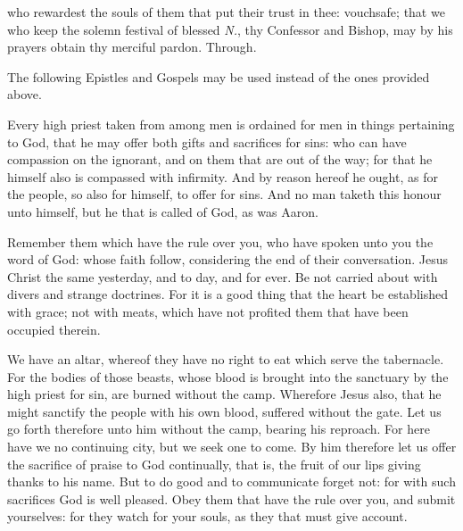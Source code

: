 \postcommunion\label{CommonConfessorBishopIIPostcommunion}

\vspace{-0.1\baselineskip}

 who rewardest the souls of them that put their trust in thee: vouchsafe; that we who keep the solemn festival of blessed \textit{N.}, thy Confessor and Bishop, may by his prayers obtain thy merciful pardon. Through.

\clearpage
\begin{rubric}
	The following Epistles and Gospels may be used instead of the ones provided above.
\end{rubric}

\label{Hebrews51}
 Every high priest taken from among men is ordained for men in things pertaining to God, that he may offer both gifts and sacrifices for sins: who can have compassion on the ignorant, and on them that are out of the way; for that he himself also is compassed with infirmity. And by reason hereof he ought, as for the people, so also for himself, to offer for sins. And no man taketh this honour unto himself, but he that is called of God, as was Aaron.

 Remember them which have the rule over you, who have spoken unto you the word of God: whose faith follow, considering the end of their conversation. Jesus Christ the same yesterday, and to day, and for ever. Be not carried about with divers and strange doctrines. For it is a good thing that the heart be established with grace; not with meats, which have not profited them that have been occupied therein.

We have an altar, whereof they have no right to eat which serve the tabernacle. For the bodies of those beasts, whose blood is brought into the sanctuary by the high priest for sin, are burned without the camp. Wherefore Jesus also, that he might sanctify the people with his own blood, suffered without the gate. Let us go forth therefore unto him without the camp, bearing his reproach. For here have we no continuing city, but we seek one to come. By him therefore let us offer the sacrifice of praise to God continually, that is, the fruit of our lips giving thanks to his name. But to do good and to communicate forget not: for with such sacrifices God is well pleased. Obey them that have the rule over you, and submit yourselves: for they watch for your souls, as they that must give account.

